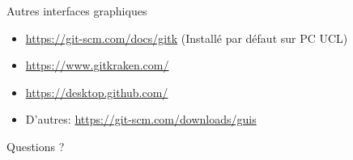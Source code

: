 \documentclass{beamer}
\begin{document}
\begin{frame}{Autres interfaces graphiques}
    \begin{itemize}
        \item \url{https://git-scm.com/docs/gitk} (Installé par défaut sur PC UCL)
        \item \url{https://www.gitkraken.com/}
        \item \url{https://desktop.github.com/}
        \item D'autres: \url{https://git-scm.com/downloads/guis}
    \end{itemize}
\end{frame}

\begin{frame}[standout]
    Questions ?
\end{frame}
\end{document}
